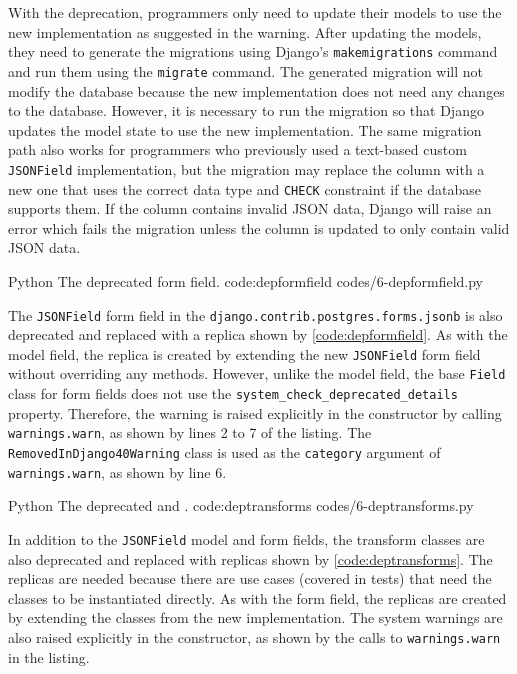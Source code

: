 With the deprecation, programmers only need to update their models to use the
new implementation as suggested in the warning. After updating the models, they
need to generate the migrations using Django's \verb|makemigrations| command
and run them using the \verb|migrate| command. The generated migration will not
modify the database because the new implementation does not need any changes to
the database. However, it is necessary to run the migration so that Django
updates the model state to use the new implementation. The same migration path
also works for programmers who previously used a text-based custom
\verb|JSONField| implementation, but the migration may replace the column with
a new one that uses the correct data type and \verb|CHECK| constraint if the
database supports them. If the column contains invalid JSON data, Django will
raise an error which fails the migration unless the column is updated to only
contain valid JSON data.

\listing
{Python}
{The deprecated  form field.}
{code:depformfield}
{codes/6-depformfield.py}

The \verb|JSONField| form field in the
\verb|django.contrib.postgres.forms.jsonb| is also deprecated and replaced with
a replica shown by \autoref{code:depformfield}. As with the model field, the
replica is created by extending the new \verb|JSONField| form field without
overriding any methods. However, unlike the model field, the base \verb|Field|
class for form fields does not use the \verb|system_check_deprecated_details|
property. Therefore, the warning is raised explicitly in the constructor by
calling \verb|warnings.warn|, as shown by lines 2 to 7 of the listing. The
\verb|RemovedInDjango40Warning| class is used as the \verb|category| argument
of \verb|warnings.warn|, as shown by line 6.

\listing
{Python}
{The deprecated  and .}
{code:deptransforms}
{codes/6-deptransforms.py}

In addition to the \verb|JSONField| model and form fields, the transform
classes are also deprecated and replaced with replicas shown by
\autoref{code:deptransforms}. The replicas are needed because there are use
cases (covered in tests) that need the classes to be instantiated directly. As
with the form field, the replicas are created by extending the classes from the
new implementation. The system warnings are also raised explicitly in the
constructor, as shown by the calls to \verb|warnings.warn| in the listing.

